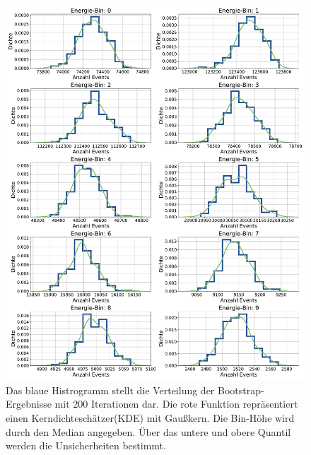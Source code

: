\begin{figure}%
    \centering%
    \includegraphics[width=\textwidth]{Plots/NN/class_dist_10bins_50ep_500000samples_200pulls.pdf}%
    \caption[Ergebnisse des Bootstrapping-Vefahrens für das NN ohne DSEA]{Das blaue Histrogramm stellt die Verteilung der Bootstrap-Ergebnisse mit 200 Iterationen dar.
    Die rote Funktion repräsentiert einen Kerndichteschätzer(KDE) mit Gaußkern.
    Die Bin-Höhe wird durch den Median angegeben.
    Über das untere und obere Quantil werden die Unsicherheiten bestimmt.
    }%
    \label{fig:NN_bootstrap}%
\end{figure}%

